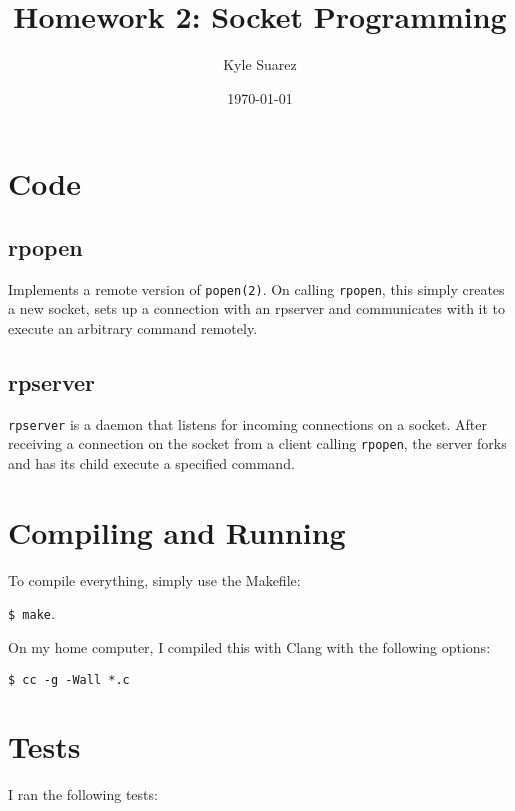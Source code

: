 \documentclass{article}
\begin{document}
\title{Homework 2: Socket Programming}
\author{Kyle Suarez}
\date{\today}
\maketitle

\section{Code}
\subsection{rpopen}
Implements a remote version of \texttt{popen(2)}. On calling \texttt{rpopen},
this simply creates a new socket, sets up a connection with an rpserver and
communicates with it to execute an arbitrary command remotely.

\subsection{rpserver}
\texttt{rpserver} is a daemon that listens for incoming connections on a socket.
After receiving a connection on the socket from a client calling
\texttt{rpopen}, the server forks and has its child execute a specified command.

\section{Compiling and Running}
To compile everything, simply use the Makefile:

\texttt{\$ make}.

On my home computer, I compiled this with Clang with the following options:

\texttt{\$ cc -g -Wall *.c}

\section{Tests}
I ran the following tests:
\begin{enumerate}
\end{enumerate}
\end{document}
